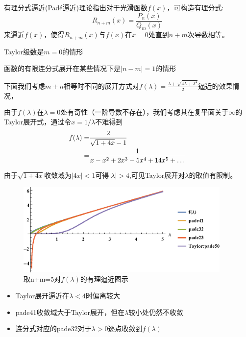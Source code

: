 \documentclass[notheorems,xetex]{beamer}
\theoremstyle{definition}
\begin{document}
\begin{frame}[noframenumbering]
有理分式逼近(Pad\'{e}逼近)理论指出对于光滑函数$f(x)$，可构造有理分式:
\[
R_{n+m}(x)=\frac{P_n(x)}{Q_m(x)}
\]
来逼近$f(x)$，使得$R_{n+m}(x)$与$f(x)$在$x=0$处直到$n+m$次导数相等。
\pause


Taylor级数是$m=0$的情形
\pause

函数的有限连分式展开在某些情况下是$|n-m|=1$的情形
\begin{flushright}
\end{flushright}
\end{frame}
\begin{frame}[noframenumbering]
下面我们考虑$m+n$相等时不同的展开方式对$f(\lambda)=\frac{\lambda+\sqrt{4\lambda+\lambda^2}}{2}$逼近的效果情况，
\pause

由于$f(\lambda)$在$\lambda=0$处有奇性（一阶导数不存在），我们考虑其在复平面关于$\infty$的Taylor展开式，通过令$x=1/\lambda$不难得到
\begin{align}\notag
f(\lambda)=&\frac{2}{\sqrt{1+4x}-1}\\
=&\frac{1}{x-x^2+2x^3-5x^4+14x^5+\dots}
\end{align}

由于$\sqrt{1+4x}$收敛域为$|4x|<1$可得$|\lambda|>4$,可见Taylor展开对$\lambda$的取值有限制。
\end{frame}
\begin{frame}[noframenumbering]
\begin{figure}
\centering
\caption*{取n+m=5对$f(\lambda)$的有理逼近图示}
\includegraphics[width=300pt]{pade.eps}
\end{figure}
\begin{itemize}
  \item Taylor展开逼近在$\lambda<4$时偏离较大
  \item pade41收敛域大于Taylor展开，但在$\lambda$较小处仍然不收敛
  \item 连分式对应的pade32对于$\lambda>0$逐点收敛到$f(\lambda)$
\end{itemize}
\end{frame}
\end{document}
